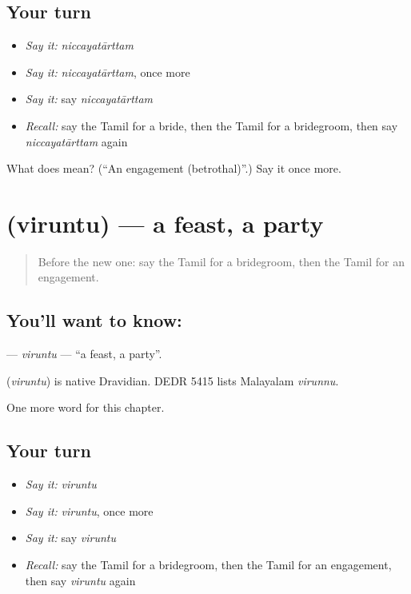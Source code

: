 \subsection*{Your turn}
\begin{itemize}
\raggedright
  \item \emph{Say it:} \emph{niccayatārttam}
  \item \emph{Say it:} \emph{niccayatārttam}, once more
  \item \emph{Say it:} say \emph{niccayatārttam}
  \item \emph{Recall:} say the Tamil for a bride, then the Tamil for a bridegroom, then say \emph{niccayatārttam} again
\end{itemize}

\begin{tcolorbox}[breakable,colback=teal!4,colframe=teal!35!black,title={Before you move on}]
What does  mean? (\textquotedblleft{}An engagement (betrothal)\textquotedblright{}.) Say it once more.
\end{tcolorbox}
\section[\texorpdfstring{\ta{விருந்து} (viruntu)}{விருந்து (viruntu)}]{ (viruntu) — a feast, a party}

\label{lesson:TA-C217-viruntu}



\begin{quote}
Before the new one: say the Tamil for a bridegroom, then the Tamil for an engagement.
\end{quote}

\subsection*{You'll want to know: }
\textbf{} — \emph{viruntu} — \textquotedblleft{}a feast, a party\textquotedblright{}.

\begin{cousinweb}
\textbf{} (\emph{viruntu}) is native Dravidian. DEDR 5415 lists Malayalam \emph{virunnu}.
\end{cousinweb}

\begin{grammarlens}[title={What you've built}]
One more word for this chapter.
\end{grammarlens}

\subsection*{Your turn}
\begin{itemize}
\raggedright
  \item \emph{Say it:} \emph{viruntu}
  \item \emph{Say it:} \emph{viruntu}, once more
  \item \emph{Say it:} say \emph{viruntu}
  \item \emph{Recall:} say the Tamil for a bridegroom, then the Tamil for an engagement, then say \emph{viruntu} again
\end{itemize}

